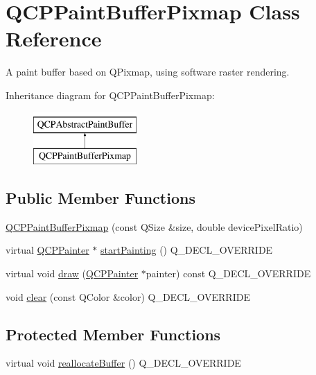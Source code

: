 \hypertarget{class_q_c_p_paint_buffer_pixmap}{}\section{Q\+C\+P\+Paint\+Buffer\+Pixmap Class Reference}
\label{class_q_c_p_paint_buffer_pixmap}


A paint buffer based on Q\+Pixmap, using software raster rendering.  


Inheritance diagram for Q\+C\+P\+Paint\+Buffer\+Pixmap\+:\begin{figure}[H]
\begin{center}
\leavevmode
\includegraphics[height=2.000000cm]{class_q_c_p_paint_buffer_pixmap}
\end{center}
\end{figure}
\subsection*{Public Member Functions}
\begin{DoxyCompactItemize}
\item 
\hyperlink{class_q_c_p_paint_buffer_pixmap_aef0224e03b9285509391fcd61a8e6844}{Q\+C\+P\+Paint\+Buffer\+Pixmap} (const Q\+Size \&size, double device\+Pixel\+Ratio)
\item 
virtual \hyperlink{class_q_c_p_painter}{Q\+C\+P\+Painter} $\ast$ \hyperlink{class_q_c_p_paint_buffer_pixmap_a357964ef7d28cfa530338be4e5c93234}{start\+Painting} () Q\+\_\+\+D\+E\+C\+L\+\_\+\+O\+V\+E\+R\+R\+I\+DE
\item 
virtual void \hyperlink{class_q_c_p_paint_buffer_pixmap_af7bfc685e56a0a9329e57cd9a265eb74}{draw} (\hyperlink{class_q_c_p_painter}{Q\+C\+P\+Painter} $\ast$painter) const Q\+\_\+\+D\+E\+C\+L\+\_\+\+O\+V\+E\+R\+R\+I\+DE
\item 
void \hyperlink{class_q_c_p_paint_buffer_pixmap_a14badbd010a3cde6b55817ccb7b65217}{clear} (const Q\+Color \&color) Q\+\_\+\+D\+E\+C\+L\+\_\+\+O\+V\+E\+R\+R\+I\+DE
\end{DoxyCompactItemize}
\subsection*{Protected Member Functions}
\begin{DoxyCompactItemize}
\item 
virtual void \hyperlink{class_q_c_p_paint_buffer_pixmap_ad49f3205ba3463b1c44f8db3cfcc90f0}{reallocate\+Buffer} () Q\+\_\+\+D\+E\+C\+L\+\_\+\+O\+V\+E\+R\+R\+I\+DE
\end{DoxyCompactItemize}

